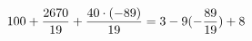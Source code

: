 \documentclass[preview]{standalone}
\begin{document}
\begin{align*}
\special{dvisvgm:raw <g id='unique000'>}100 + \frac{2670}{19} +\frac{40 \cdot (-89)}{19} = 3 - 9 (- \frac{89}{19}) + 8\special{dvisvgm:raw </g>}
\end{align*}
\end{document}
